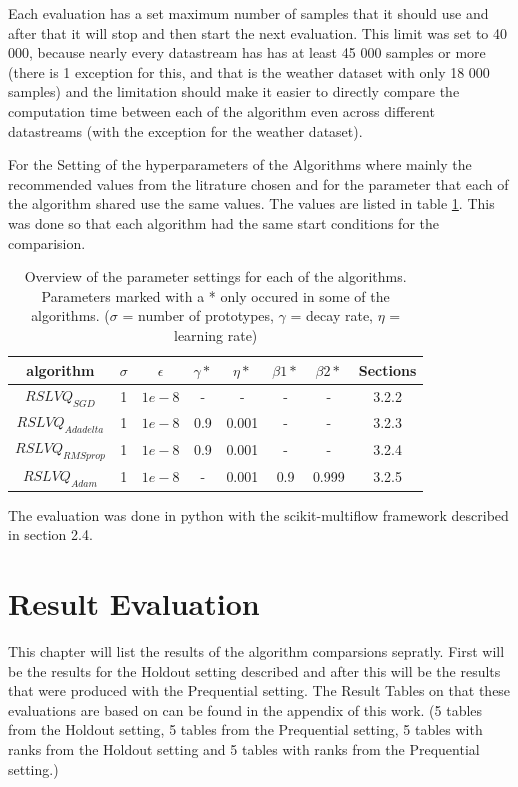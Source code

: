 \documentclass[12pt,oneside,a4paper,parskip]{scrbook}
\begin{document}
Each evaluation has a set maximum number of samples that it should use and after that it will stop and then start the next evaluation.
This limit was set to 40 000, because nearly every datastream has has at least 45 000 samples or more (there is 1 exception for this,
and that is the weather dataset with only 18 000 samples) and the limitation should make it easier to directly compare the computation time 
between  each of the algorithm even across different datastreams (with the exception for the weather dataset).

For the Setting of the hyperparameters of the Algorithms where mainly the recommended values from the litrature chosen and for 
the parameter that each of the algorithm shared use the same values.
The values are listed in table \ref{tab:parameters}.
This was done so that each algorithm had the same start conditions for the comparision.

\begin{table}[H]
  \centering
  \begin{tabular} {|| c c c c c c c c||} 
    \hline
      algorithm & $\sigma$ & $\epsilon$ & $\gamma*$ & $\eta*$ & $\beta 1*$ & $\beta 2*$ & Sections\\
    \hline\hline
      $RSLVQ_\textit{SGD}$ & 1 & $1e-8$ & - & - & - & - & 3.2.2\\
    \hline 
      $RSLVQ_\textit{Adadelta}$ & 1 & $1e-8$ & 0.9 & 0.001 & - & - & 3.2.3\\
    \hline
      $RSLVQ_\textit{RMSprop}$ & 1 & $1e-8$ & 0.9 & 0.001 & - & - & 3.2.4\\
    \hline
      $RSLVQ_\textit{Adam}$ & 1 & $1e-8$ & - & 0.001 & 0.9 & 0.999 & 3.2.5\\
    \hline
  \end{tabular} 
  \caption{Overview of the parameter settings for each of the algorithms. Parameters marked with a * only occured in some of the algorithms.
  ($\sigma$ = number of prototypes, $\gamma$ = decay rate, $\eta$ = learning rate)}
  \label{tab:parameters}
\end{table}

The evaluation was done in python with the scikit-multiflow framework described in section 2.4.

\chapter{Result Evaluation}
This chapter will list the results of the algorithm comparsions sepratly.
First will be the results for the Holdout setting described and after this will be the results that were produced with the 
Prequential setting. The Result Tables on that these evaluations are based on can be found in the appendix of this work.
(5 tables from the Holdout setting, 5 tables from the Prequential setting, 5 tables with ranks from the Holdout setting
and 5 tables with ranks from the Prequential setting.) 
\end{document}
